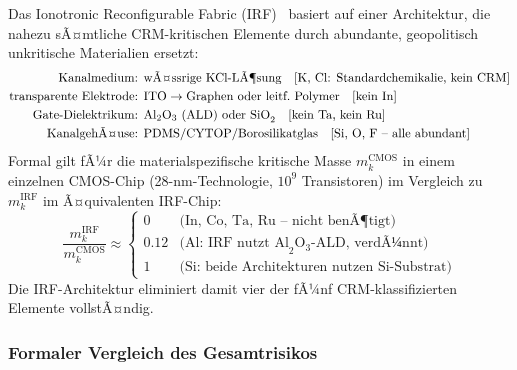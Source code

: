 ﻿\documentclass[12pt, a4paper]{report}
\theoremstyle{definition}
\theoremstyle{remark}
\begin{document}
Das Ionotronic Reconfigurable Fabric (IRF)~\cite{ionotronik2026} basiert
auf einer Architektur, die nahezu sÃ¤mtliche CRM-kritischen Elemente durch
abundante, geopolitisch unkritische Materialien ersetzt:
\begin{align}
  \text{Kanalmedium: }
    & \text{wÃ¤ssrige KCl-LÃ¶sung}\quad
      [\text{K, Cl: Standardchemikalie, kein CRM}] \notag \\
  \text{transparente Elektrode: }
    & \text{ITO}\to\text{Graphen oder leitf.\ Polymer}\quad
      [\text{kein In}] \notag \\
  \text{Gate-Dielektrikum: }
    & \text{Al}_2\text{O}_3\text{ (ALD) oder SiO}_2\quad
      [\text{kein Ta, kein Ru}] \notag \\
  \text{KanalgehÃ¤use: }
    & \text{PDMS/CYTOP/Borosilikatglas}\quad
      [\text{Si, O, F -- alle abundant}] \notag
\end{align}
Formal gilt fÃ¼r die materialspezifische kritische Masse
$m_k^\text{CMOS}$ in einem einzelnen CMOS-Chip (28-nm-Technologie,
$10^9$ Transistoren) im Vergleich zu $m_k^\text{IRF}$ im Ã¤quivalenten
IRF-Chip:
\begin{equation}
  \frac{m_k^\text{IRF}}{m_k^\text{CMOS}}
  \approx
  \begin{cases}
    0      & \text{(In, Co, Ta, Ru -- nicht benÃ¶tigt)} \\
    0.12   & \text{(Al: IRF nutzt Al}_2\text{O}_3\text{-ALD, verdÃ¼nnt)} \\
    1      & \text{(Si: beide Architekturen nutzen Si-Substrat)}
  \end{cases}
  \label{eq:crm_ratio}
\end{equation}
Die IRF-Architektur eliminiert damit vier der fÃ¼nf CRM-klassifizierten
Elemente vollstÃ¤ndig.

\subsubsection{Formaler Vergleich des Gesamtrisikos}
\end{document}
